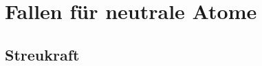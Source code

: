 \documentclass[12pt,xcolor=dvipsnames]{beamer}
\begin{document}
%
%

\section{Fallen für neutrale Atome}

\subsection{Streukraft}
\end{document}

